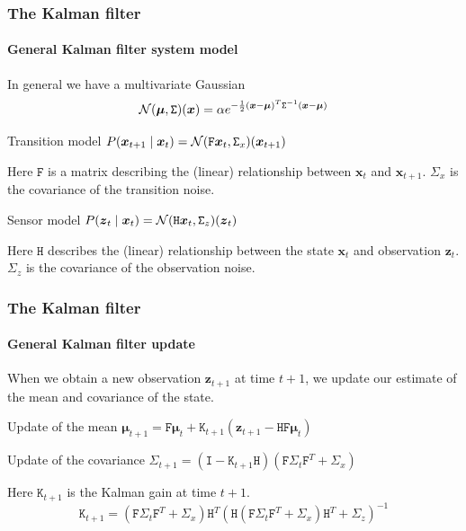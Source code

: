 \documentclass[aspectratio=169]{beamer}
\renewcommand{\vec}[1]{\boldsymbol{#1}}
\newcommand{\mat}[1]{\mathtt{#1}}
\def\norm{\mbox{$\cal{N}$}}
\begin{document}
\begin{frame}
\frametitle{The Kalman filter}
\framesubtitle{General Kalman filter system model}

In general we have a multivariate Gaussian
\[ \norm(\vec{\mu},\mat{\Sigma})(\vec{x}) = \alpha
    e^{ -\frac{1}{2} (\vec{x}-\vec{\mu})^T \mat{\Sigma}^{-1}
    (\vec{x}-\vec{\mu}) } \]

\begin{block}{Transition model}
$P(\vec{x}_{t+1} \mid \vec{x}_t) =
\norm(\mat{F}\vec{x}_t,\mat{\Sigma}_x)(\vec{x}_{t+1})$
\end{block}
Here $\mat{F}$ is a matrix describing the (linear) relationship between
$\vec{x}_{t}$ and $\vec{x}_{t+1}$.  $\mat{\Sigma}_x$ is the covariance of
the transition noise.

\begin{block}{Sensor model}
$P(\vec{z}_t \mid \vec{x}_t) =
\norm(\mat{H}\vec{x}_t,\mat{\Sigma}_z)(\vec{z}_t)$
\end{block}

Here $\mat{H}$ describes the (linear) relationship between the state
$\vec{x}_{t}$ and observation $\vec{z}_t$.  $\mat{\Sigma}_z$ is the
covariance of the observation noise.

\end{frame}

\begin{frame}
\frametitle{The Kalman filter}
\framesubtitle{General Kalman filter update}

When we obtain a new observation $\vec{z}_{t+1}$ at time $t+1$, we
update our estimate of the mean and covariance of the state.

\begin{block}{Update of the mean}
$\vec{\mu}_{t+1} = \mat{F} \vec{\mu}_t + \mat{K}_{t+1} ( \vec{z}_{t+1}
- \mat{H} \mat{F} \vec{\mu}_t )$
\end{block}

\begin{block}{Update of the covariance}
$\mat{\Sigma}_{t+1} = ( \mat{I} - \mat{K}_{t+1} \mat{H}) ( \mat{F}
\mat{\Sigma}_t \mat{F}^T + \mat{\Sigma}_x )$
\end{block}

Here $\mat{K}_{t+1}$ is the \alert{Kalman gain} at time $t+1$.
\begin{equation*}
\mat{K}_{t+1} = (\mat{F}\mat{\Sigma}_t \mat{F}^T + \mat{\Sigma}_x)
\mat{H}^T (\mat{H}(\mat{F} \mat{\Sigma}_t \mat{F}^T +
\mat{\Sigma}_x)\mat{H}^T + \mat{\Sigma}_z)^{-1}
\end{equation*}


\end{frame}
\end{document}
